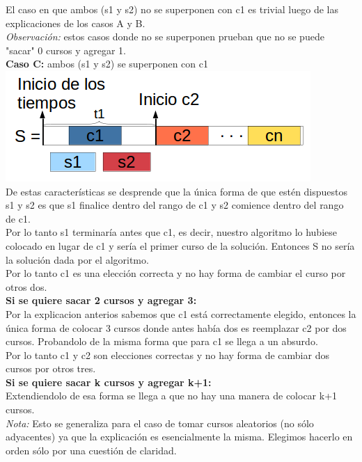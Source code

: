 El caso en que ambos (s1 y s2) no se superponen con c1 es trivial luego de las explicaciones de los casos A y B.\\
\textit{Observación:} estos casos donde no se superponen prueban que no se puede "sacar"  0 cursos y agregar 1.\\

\newpage
\textbf{Caso C:} ambos (s1 y s2) se superponen con c1\\
\includegraphics[scale=0.8]{ej2/Graficos/casoC.png}\\
De estas características se desprende que la única forma de que estén dispuestos s1 y s2 es que s1 finalice dentro del rango de c1 y s2 comience dentro del rango de c1.\\
Por lo tanto s1 terminaría antes que c1, es decir, nuestro algoritmo lo hubiese colocado en lugar de c1 y sería el primer curso de la solución. Entonces S no sería la solución dada por el algoritmo.\\

Por lo tanto c1 es una elección correcta y no hay forma de cambiar el curso por otros dos.\\

\textbf{Si se quiere sacar 2 cursos y agregar 3:}\\
Por la explicacion anterios sabemos que c1 está correctamente elegido, entonces la única forma de colocar 3 cursos donde antes había dos es reemplazar c2 por dos cursos. Probandolo de la misma forma que para c1 se llega a un absurdo.\\

Por lo tanto c1 y c2 son elecciones correctas y no hay forma de cambiar dos cursos por otros tres.\\

\textbf{Si se quiere sacar k cursos y agregar k+1:}\\
Extendiendolo de esa forma se llega a que no hay una manera de colocar k+1 cursos.\\

\textit{Nota:} Esto se generaliza para el caso de tomar cursos aleatorios (no sólo adyacentes) ya que la explicación es esencialmente la misma. Elegimos hacerlo en orden sólo por una cuestión de claridad.\\




